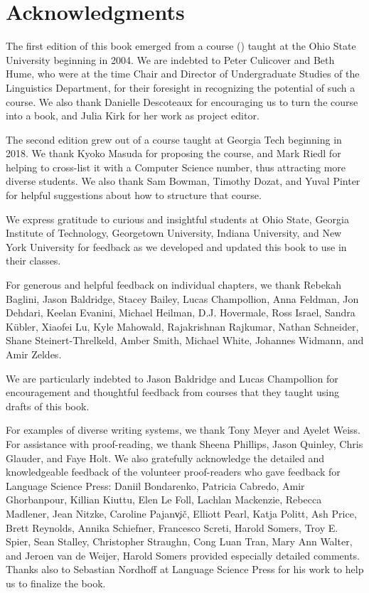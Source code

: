 \chapter{Acknowledgments}


\label{ch:acknowledgements}

The first edition of this book emerged from a course () taught at the Ohio State University beginning in
2004.  We are indebted to Peter Culicover and Beth Hume, who were at
the time Chair and Director of Undergraduate Studies of the
Linguistics Department, for their foresight in recognizing the
potential of such a course.  We also thank Danielle Descoteaux for
encouraging us to turn the course into a book, and Julia Kirk for her
work as project editor.

The second edition grew out of a course taught at Georgia Tech
beginning in 2018.  We thank Kyoko Masuda for proposing the course,
and Mark Riedl for helping to cross-list it with a Computer Science
number, thus attracting more diverse students.  We also thank Sam
Bowman, Timothy Dozat, and Yuval Pinter for helpful suggestions about how to structure
that course.

We express gratitude to curious and insightful students at Ohio State, Georgia Institute of Technology, Georgetown University, Indiana University, and New York University for feedback as we developed and updated this book to use in their classes.

For generous and helpful feedback on individual chapters, we thank 
Rebekah Baglini,
Jason Baldridge,
Stacey Bailey,  
Lucas Champollion,
Anna Feldman, 
 Jon Dehdari,  
Keelan Evanini,
 Michael Heilman,
 D.J. Hovermale,
   Ross Israel, 
   Sandra K\"ubler, 
   Xiaofei Lu, 
   Kyle Mahowald,
Rajakrishnan Rajkumar, 
Nathan Schneider,
Shane Steinert-Threl\-keld,
Amber Smith, 
Michael White, 
Johannes Widmann, and
Amir Zeldes.

We are particularly indebted to Jason Baldridge and Lucas Champollion for encouragement and thoughtful feedback from courses that they taught using drafts of this book.

For examples of diverse writing systems, we thank Tony Meyer and Ayelet Weiss.
For assistance with proof-reading, we thank Sheena Phillips, Jason Quinley, Chris Glauder, and Faye Holt.  We also gratefully acknowledge  the detailed and knowledgeable feedback of the volunteer proof-readers who gave feedback for Language Science Press: 
Daniil Bondarenko,
Patricia Cabredo,
Amir Ghorbanpour,
Killian Kiuttu,
Elen Le Foll,
Lachlan Mackenzie,
Rebecca Madlener,
Jean Nitzke,
Caroline Pajan\c{v}i\v{c},
Elliott Pearl,
Katja Politt,
Ash Price,
Brett Reynolds,
Annika Schiefner,
Francesco Screti,
Harold Somers,
Troy E. Spier,
Sean Stalley,
Christopher Straughn,
Cong Luan Tran,
Mary Ann Walter, and 
Jeroen van de Weijer,
Harold Somers provided especially detailed comments.  Thanks also to Sebastian Nordhoff at Language Science Press for his work to help us to finalize the book.


